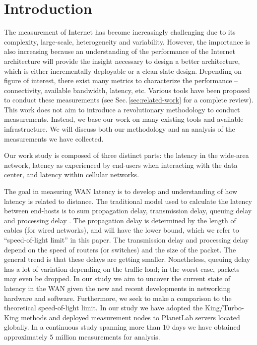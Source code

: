 \section{Introduction}
\label{sec:introduction}

The measurement of Internet has become increasingly challenging due to its complexity, large-scale, heterogeneity and variability. However, the importance is also increasing because an understanding of the performance of the Internet architecture will provide the insight necessary to design a better architecture, which is either incrementally deployable or a clean slate design. Depending on figure of interest, there exist many metrics to characterize the performance -- connectivity, available bandwidth, latency, etc. Various tools have been proposed to conduct these measurements (see Sec.\,\ref{sec:related-work} for a complete review). This work does not aim to introduce a revolutionary methodology to conduct measurements. Instead, we base our work on many existing tools and available infrastructure. We will discuss both our methodology and an analysis of the measurements we have collected.

Our work study is composed of three distinct parts: the latency in the wide-area network,  latency as experienced by end-users when interacting with the data center, and latency within cellular networks.

The goal in measuring WAN latency is to develop and understanding of how latency is related to distance. The traditional model used to calculate the latency between end-hosts is to sum propagation delay, transmission delay, queuing delay and processing delay \cite{kurose2001computer}. The propagation delay is determined by the length of cables (for wired networks), and will have the lower bound, which we refer to ``speed-of-light limit'' in this paper. The transmission delay and processing delay depend on the speed of routers (or switches) and the size of the packet. The general trend is that these delays are getting smaller. Nonetheless, queuing delay has a lot of variation depending on the traffic load; in the worst case, packets may even be dropped. In our study we aim to uncover the current state of latency in the WAN given the new and recent developments in networking hardware and software. Furthermore, we seek to make a comparison to the theoretical speed-of-light limit. In our study we have adopted the King/Turbo-King \cite{gummadi2002king, leonard2008turbo} methods and deployed measurement nodes to PlanetLab \cite{chun2003planetlab} servers located globally. In a continuous study spanning more than 10 days we have obtained approximately 5 million measurements for analysis.


